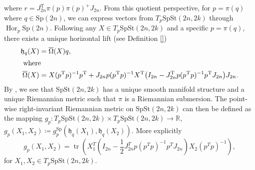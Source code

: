 %
where $r=J_{2n}^{\mathrm{T}}\pi(p)\pi (p)^+J_{2n}$. From this quotient perspective, for $p=\pi(q)$ where $q\in \mathrm{Sp}(2n)$, we can express vectors from $T_{p}\mathrm{SpSt}(2n, 2k)$ through $\operatorname{Hor}_{p}\mathrm{Sp}(2n)$. Following \cite[p.~5]{JensenZimmermann2024} any $X\in T_{p}\mathrm{SpSt}(2n, 2k)$ and a specific $p=\pi (q)$, there exists a unique horizontal lift (see Definition \ref{})
%
\begin{align}
\mathfrak{h}_{q}(X)&=\overline{\Omega}(X)q, \\
\intertext{ where }
\overline{\Omega}(X)&=X(p^{\mathrm{T}}p)^{-1}p^{\mathrm{T}}+J_{2n}p(p^{\mathrm{T}}p)^{-1}X^{\mathrm{T}}\big(I_{2n}-J_{2n}^{\mathrm{T}}p(p^{\mathrm{T}}p)^{-1}p^{\mathrm{T}}J_{2n}\big)J_{2n}.
\end{align}
%
%
%
%
By \cite[Thm.~2.28]{Lee2018}, we see that $\mathrm{SpSt}(2n, 2k)$ has a unique smooth manifold structure and a unique Riemannian metric such that $\pi$ is a Riemannian submersion. The point-wise right-invariant Riemannian metric on $\mathrm{SpSt}(2n, 2k)$ can then be defined as the mapping $g_{p}\colon T_{p}\mathrm{SpSt}(2n, 2k)\times T_{p}\mathrm{SpSt}(2n, 2k)\xrightarrow{}\mathbb{R}$, $g_{p}(X_{1},X_{2})\coloneqq g^{\mathrm{Sp}}_{p}(\mathfrak{h}_{q}(X_{1}),\mathfrak{h}_{q}(X_{2}))$. More explicitly
\begin{equation}\label{eq:spst_metric}
    g_{p}(X_{1},X_{2})=\operatorname{tr}\left(X_{1}^{T}\left(I_{2n}- \frac{1}{2}J_{2n}^{T}p(p^{T}p)^{-1}p^{T}J_{2n}\right)X_{2}(p^{T}p)^{-1}\right),
\end{equation}
for $X_{1},X_{2}\in T_{p}\mathrm{SpSt}(2n, 2k)$.


